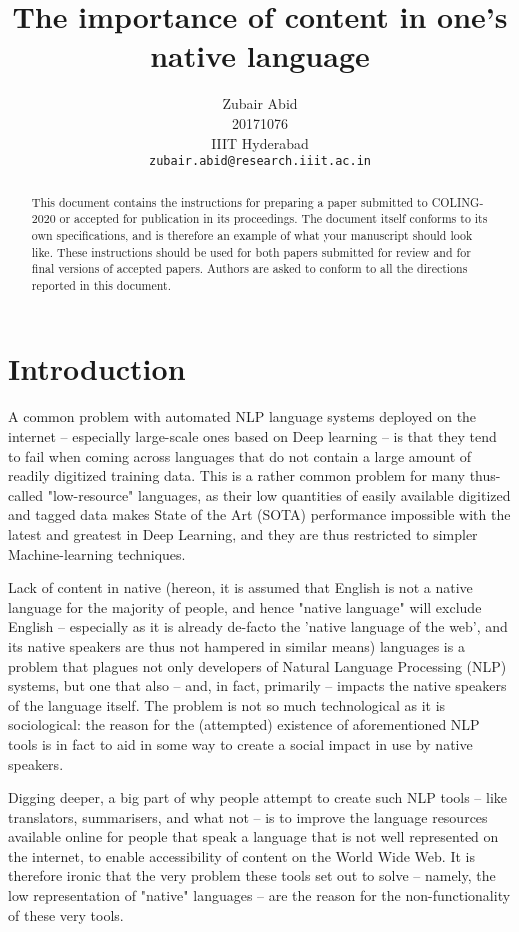 \documentclass[11pt]{article}
\title{The importance of content in one's native language}
\author{Zubair Abid \\
  20171076\\
  IIIT Hyderabad\\
  {\tt zubair.abid@research.iiit.ac.in} }%
\date{}
\begin{document}
\maketitle
\begin{abstract}
  This document contains the instructions for preparing a paper submitted
  to COLING-2020 or accepted for publication in its proceedings. The document itself
  conforms to its own specifications, and is therefore an example of
  what your manuscript should look like. These instructions should be
  used for both papers submitted for review and for final versions of
  accepted papers. Authors are asked to conform to all the directions
  reported in this document.
\end{abstract}

\section{Introduction}
\label{intro}
A common problem with automated NLP language systems deployed on the internet --
especially large-scale ones based on Deep learning --  is that they tend to fail
when coming across languages that do not contain a large amount of readily
digitized training data. This is a rather common problem for many thus-called
"low-resource" languages, as their low quantities of easily available digitized
and tagged data makes State of the Art (SOTA) performance impossible with the
latest and greatest in Deep Learning, and they are thus restricted to simpler
Machine-learning techniques.

Lack of content in native (hereon, it is assumed that English is not a native
language for the majority of people, and hence "native language" will exclude
English -- especially as it is already de-facto the 'native language of the
web', and its native speakers are thus not hampered in similar means) languages
is a problem that plagues not only developers of Natural Language Processing
(NLP) systems, but one that also -- and, in fact, primarily -- impacts the
native speakers of the language itself. The problem is not so much technological
as it is sociological: the reason for the (attempted) existence of
aforementioned NLP tools is in fact to aid in some way to create a social impact
in use by native speakers. 

Digging deeper, a big part of why people attempt to create such NLP tools -- 
like translators, summarisers, and what not -- is to improve the language
resources available online for people that speak a language that is not well
represented on the internet, to enable accessibility of content on the World
Wide Web. It is therefore ironic that the very problem these tools set out to
solve -- namely, the low representation of "native" languages -- are the reason
for the non-functionality of these very tools.
\end{document}
